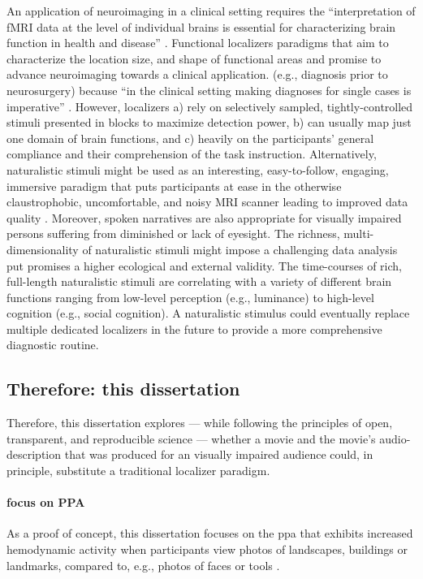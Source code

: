 An application of neuroimaging in a clinical setting requires the
``interpretation of fMRI data at the level of individual brains is essential for
characterizing brain function in health and disease''
\citep{dubois2016building}.
Functional localizers paradigms that aim to characterize the location size, and
shape of functional areas and promise to advance neuroimaging towards a clinical
application.  (e.g., diagnosis prior to neurosurgery) because ``in the clinical
setting making diagnoses for single cases is imperative''
\citep{wegrzyn2018thought}.
However, localizers a) rely on selectively sampled, tightly-controlled stimuli
presented in blocks to maximize detection power, b) can usually map just one
domain of brain functions, and c) heavily on the participants' general
compliance and their comprehension of the task instruction.
Alternatively, naturalistic stimuli might be used as an interesting,
easy-to-follow, engaging, immersive paradigm that puts participants at ease in
the otherwise claustrophobic, uncomfortable, and noisy MRI scanner leading to
improved data quality \citep{eickhoff2020towards}.
%
Moreover, spoken narratives are also appropriate for visually impaired persons
suffering from diminished or lack of eyesight.
%
The richness, multi-dimensionality of naturalistic stimuli might impose a
challenging data analysis put promises a higher ecological and external
validity.
%
The time-courses of rich, full-length naturalistic stimuli are correlating with
a variety of different brain functions ranging from low-level perception (e.g.,
luminance) to high-level cognition (e.g., social cognition).
%
A naturalistic stimulus could eventually replace multiple dedicated localizers
in the future to provide a more comprehensive diagnostic routine.


\subsection{Therefore: this dissertation}

%
Therefore, this dissertation explores --- while following the principles of
open, transparent, and reproducible science --- whether a movie and the movie's
audio-description that was produced for an visually impaired audience could, in
principle, substitute a traditional localizer paradigm.

\paragraph{focus on PPA}
As a proof of concept, this dissertation focuses on the \ac{ppa} that exhibits
increased hemodynamic activity when participants view photos of landscapes,
buildings or landmarks, compared to, e.g., photos of faces or tools
\citep[e.g.,][for reviews]{epstein2014neural, aminoff2013role}.


